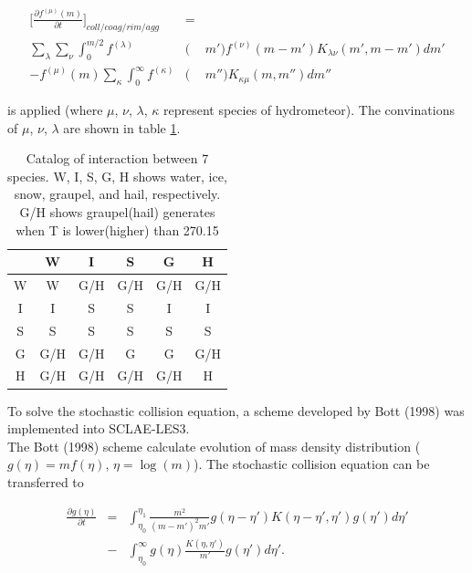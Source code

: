 \begin{eqnarray}
\Bigr[\frac{\partial f^{(\mu)}(m)}{\partial t}\Bigr]_{coll/coag/rim/agg}&=&\nonumber\\
\sum_{\lambda}\sum_{\nu}\int_{0}^{m/2}f^{(\lambda)}&(&m')f^{(\nu)}(m-m')K_{\lambda\nu}(m',m-m')dm' \nonumber\\
-f^{(\mu)}(m)\sum_{\kappa}\int_0^{\infty}f^{(\kappa)}&(&m'')K_{\kappa\mu}(m,m'')dm''\label{s10-16}
\end{eqnarray}

is applied (where $\mu$, $\nu$, $\lambda$, $\kappa$ represent species of hydrometeor). The convinations of $\mu$, $\nu$, $\lambda$ are shown in table \ref{table-s10-1}.

\begin{table}[h]
\begin{center}
\caption{Catalog of interaction between 7 species. W, I, S, G, H shows water, ice, snow, graupel, and hail, respectively. G/H shows graupel(hail) generates when T is lower(higher) than 270.15}
\label{table-s10-1}
\begin{tabular}{cccccc}
\hline
     & W   & I   & S   & G   & H   \\ \hline\hline
W    & W   & G/H & G/H & G/H & G/H \\ \hline
I    & I   & S   & S   & I   & I   \\ \hline
S    & S   & S   & S   & S   & S   \\ \hline
G    & G/H & G/H & G   & G   & G/H \\ \hline
H    & G/H & G/H & G/H & G/H & H   \\ \hline
\end{tabular}
\end{center}
\end{table}


To solve the stochastic collision equation, a scheme developed by Bott (1998) was implemented into SCLAE-LES3.\\
The Bott (1998) scheme calculate evolution of mass density distribution ($g(\eta)=mf(\eta)$, $\eta=\log(m)$). The stochastic collision equation can be transferred to

\begin{eqnarray}
\frac{\partial g(\eta)}{\partial t}&=&\int_{\eta_{0}}^{\eta_{1}}\frac{m^{2}}{(m-m')^{2} m'}g(\eta-\eta') K(\eta-\eta',\eta')g(\eta')d\eta' \nonumber\\
&-&\int_{\eta_{0}}^{\infty} g(\eta)\frac{K(\eta,\eta')}{m'}g(\eta')d\eta'.\label{s10-17}
\end{eqnarray}

